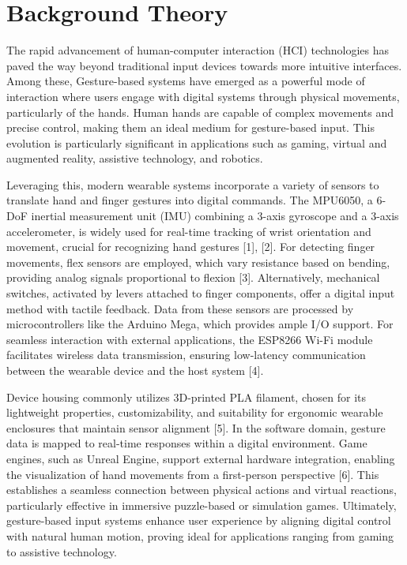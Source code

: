 \section{Background Theory}
The rapid advancement of human-computer interaction (HCI) technologies has paved the way beyond traditional input devices towards more intuitive interfaces. Among these, Gesture-based systems have emerged as a powerful mode of interaction where users engage with digital systems through physical movements, particularly of the hands. Human hands are capable of complex movements and precise control, making them an ideal medium for gesture-based input. This evolution is particularly significant in applications such as gaming, virtual and augmented reality, assistive technology, and robotics.

Leveraging this, modern wearable systems incorporate a variety of sensors to translate hand and finger gestures into digital commands. The MPU6050, a 6-DoF inertial measurement unit (IMU) combining a 3-axis gyroscope and a 3-axis accelerometer, is widely used for real-time tracking of wrist orientation and movement, crucial for recognizing hand gestures [1], [2]. For detecting finger movements, flex sensors are employed, which vary resistance based on bending, providing analog signals proportional to flexion [3]. Alternatively, mechanical switches, activated by levers attached to finger components, offer a digital input method with tactile feedback. Data from these sensors are processed by microcontrollers like the Arduino Mega, which provides ample I/O support. For seamless interaction with external applications, the ESP8266 Wi-Fi module facilitates wireless data transmission, ensuring low-latency communication between the wearable device and the host system [4].

Device housing commonly utilizes 3D-printed PLA filament, chosen for its lightweight properties, customizability, and suitability for ergonomic wearable enclosures that maintain sensor alignment [5]. In the software domain, gesture data is mapped to real-time responses within a digital environment. Game engines, such as Unreal Engine, support external hardware integration, enabling the visualization of hand movements from a first-person perspective [6]. This establishes a seamless connection between physical actions and virtual reactions, particularly effective in immersive puzzle-based or simulation games. Ultimately, gesture-based input systems enhance user experience by aligning digital control with natural human motion, proving ideal for applications ranging from gaming to assistive technology.

